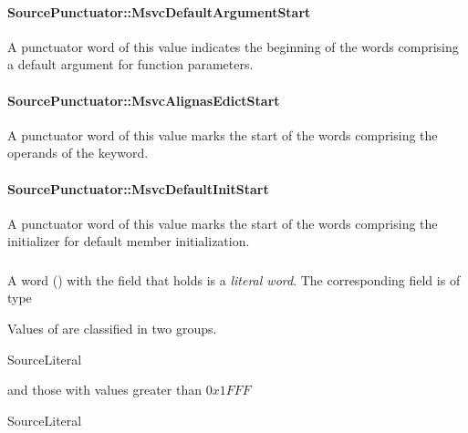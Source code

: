 \paragraph{SourcePunctuator::MsvcDefaultArgumentStart}
\label{sec:ifc:SourcePunctuator:MsvcDefaultArgumentStart}

A punctuator word of this value indicates the beginning of the words comprising
a default argument for function parameters.

\paragraph{SourcePunctuator::MsvcAlignasEdictStart}
\label{sec:ifc:SourcePunctuator:MsvcAlignasEdictStart}

A punctuator word of this value marks the start of the words comprising the operands
of the  keyword.


\paragraph{SourcePunctuator::MsvcDefaultInitStart}
\label{sec:ifc:SourcePunctuator:MsvcDefaultInitStart}

A punctuator word of this value marks the start of the words comprising the
initializer for default member initialization. 

\subsubsection{}
\label{sec:ifc:WordSort:Literal}

A word ()  with the  field that holds
 is a \emph{literal word}.  The corresponding 
 field is of type 

Values of  are classified in two groups.
\begin{Enumeration}{SourceLiteral}
\end{Enumeration}
and those with values greater than $0x1FFF$
\begin{Enumeration}{SourceLiteral}\setcounter{enumi}{8190}
\end{Enumeration}

\paragraph{}
\label{sec:ifc:SourceLiteral:Unknown}

